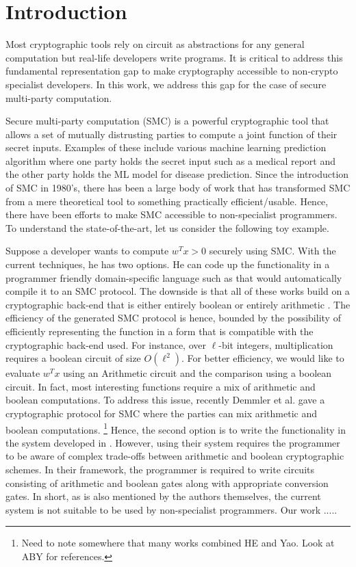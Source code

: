 \section{Introduction}
\label{sec:intro}

Most cryptographic tools rely on circuit as abstractions for any general computation but real-life developers write programs. It is critical to address this fundamental  representation gap to make cryptography accessible to non-crypto specialist developers. In this work, we address this gap for the case of secure multi-party computation.

Secure multi-party computation \cite{yao,gmw} (SMC) is a powerful cryptographic tool that allows a set of mutually distrusting parties to compute a joint function of their secret inputs. Examples of these include various machine learning prediction algorithm where one party holds the secret input such as a medical report and the other party holds the ML model for disease prediction. Since the introduction of SMC in 1980's, there has been a large body of work \cite{..} that has transformed SMC from a mere theoretical tool to something practically efficient/usable. Hence, there have been efforts to make SMC accessible to non-specialist programmers. To understand the state-of-the-art, let us consider the following toy example.

Suppose a developer wants to compute $w^Tx >0$ securely using SMC. With the current techniques, he has two options. He can code up the functionality in a programmer friendly domain-specific language such as \cite{lambdaps,wysteria,oblivm} that would automatically compile it to an SMC protocol. The downside is that all of these works build on a cryptographic back-end that is either entirely boolean \cite{yao,gmw} or entirely arithmetic \cite{homo}. The efficiency of the generated SMC protocol is hence, bounded by the possibility of efficiently representing the function in a form that is compatible with the cryptographic back-end used. For instance, over $\ell$-bit integers, multiplication requires a boolean circuit of size  $O(\ell^2)$. 
For better efficiency, we would like to evaluate $w^Tx$ using an Arithmetic circuit and the comparison using a boolean circuit.
In fact, most interesting functions require a mix of arithmetic and boolean computations.
To address this issue, recently Demmler et al. \cite{aby} gave a cryptographic protocol for SMC where the parties can mix arithmetic and boolean computations. \footnote{Need to note somewhere that many works combined HE and Yao. Look at ABY for references.}
Hence, the second option is to write the functionality in the system developed in \cite{aby}.
However, using their system requires the programmer to be aware of complex trade-offs between arithmetic and boolean cryptographic schemes. In their framework, the programmer is required to write circuits consisting of  arithmetic and boolean gates along with appropriate conversion gates. In short, as is also mentioned by the authors themselves, the current system is not suitable to be used by non-specialist programmers. 
Our work .....



